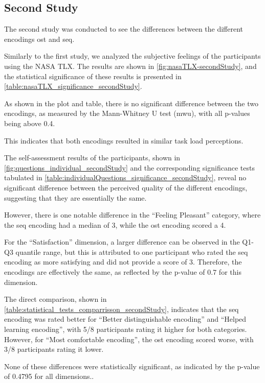 \subsection{Second Study}
The second study was conducted to see the differences between the different encodings \gls{ost} and \gls{seq}.

Similarly to the first study, we analyzed the subjective feelings of the participants using the NASA TLX. The results are shown in \autoref{fig:nasaTLX-secondStudy}, and the statistical significance of these results is presented in \autoref{table:nasaTLX_significance_secondStudy}.

As shown in the plot and table, there is no significant difference between the two encodings, as measured by the Mann-Whitney U test (\gls{mwu}), with all p-values being above 0.4.

This indicates that both encodings resulted in similar task load perceptions.

The self-assessment results of the participants, shown in \autoref{fig:questions_individual_secondStudy} and the corresponding significance tests tabulated in \autoref{table:individualQuestions_significance_secondStudy}, reveal no significant difference between the perceived quality of the different encodings, suggesting that they are essentially the same.

However, there is one notable difference in the \enquote{Feeling Pleasant} category, where the \gls{seq} encoding had a median of 3, while the \gls{ost} encoding scored a 4.

For the \enquote{Satisfaction} dimension, a larger difference can be observed in the Q1-Q3 quantile range, but this is attributed to one participant who rated the \gls{seq} encoding as more satisfying and did not provide a score of 3. Therefore, the encodings are effectively the same, as reflected by the p-value of 0.7 for this dimension.

The direct comparison, shown in \autoref{table:statistical_tests_comparrisson_secondStudy}, indicates that the \gls{seq} encoding was rated better for \enquote{Better distinguishable encoding} and \enquote{Helped learning encoding}, with 5/8 participants rating it higher for both categories. However, for \enquote{Most comfortable encoding}, the \gls{ost} encoding scored worse, with 3/8 participants rating it lower.

None of these differences were statistically significant, as indicated by the p-value of 0.4795 for all dimensions..

